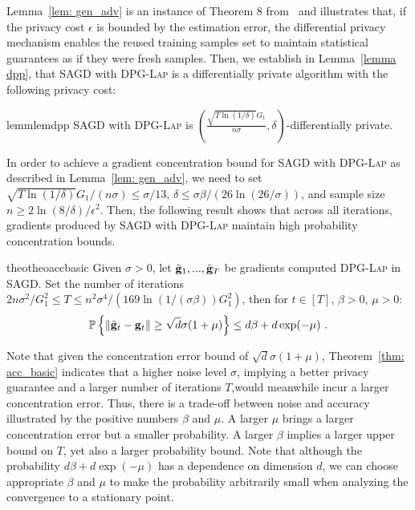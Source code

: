 \documentclass[11pt]{article}
\begin{document}
Lemma~\ref{lem: gen_adv} is an instance of Theorem 8 from~\cite{dwfe15} and illustrates that, if the privacy cost $\epsilon$ is bounded by the estimation error, the differential privacy mechanism enables the reused training samples set to maintain statistical guarantees as if they were fresh samples. 
Then, we establish in Lemma~\ref{lemma dpp}, that \textsc{SAGD} with \textsc{DPG-Lap} is a differentially private algorithm with the following privacy cost:
\begin{restatable}{lemm}{lemdpp}
\label{lemma dpp}
\textsc{SAGD} with \textsc{DPG-Lap} is $(\frac{\sqrt{T \ln(1/\delta)} G_1}{n\sigma}, \delta)$-differentially private. 
\end{restatable}  
In order to achieve a gradient concentration bound for \textsc{SAGD} with \textsc{DPG-Lap} as described in Lemma~\ref{lem: gen_adv}, we need to set $\sqrt{T \ln(1/\delta)} G_1/(n\sigma)\leq \sigma/13$, $\delta \leq \sigma \beta/(26 \ln(26/\sigma))$, and  sample size $n \geq 2\ln(8/\delta)/\epsilon^2$. 
Then, the following result shows that across all iterations, gradients produced by \textsc{SAGD} with \textsc{DPG-Lap} maintain high probability concentration bounds.

\begin{restatable}{theo}{theoaccbasic}
\label{thm: acc_basic}
Given $\sigma > 0$, let $\tilde {\mathbf{g}}_1,...,  \tilde {\mathbf{g}}_T$ be gradients computed \textsc{DPG-Lap} in \textsc{SAGD}. Set the number of iterations $ 2n\sigma^2/G_1^2\leq T \leq n^2 \sigma^4/(169 \ln(1/(\sigma \beta))G_1^2)$, then for $t \in [T]$, $\beta >0$, $\mu > 0$:
    \begin{equation*}
    \mathbb{P}\left\{\|\tilde {\mathbf{g}}_t - \mathbf{g}_t\| \geq \sqrt{d}\sigma(1+\mu)\right\} \leq d\beta + d\exp(-\mu)~.
    \end{equation*}
\end{restatable}
Note that given the concentration error bound of $\sqrt{d}\sigma(1+\mu)$, Theorem~\ref{thm: acc_basic} indicates that a higher noise level $\sigma$, implying a better privacy guarantee and a larger number of iterations $T$,would meanwhile incur a larger concentration error.
Thus, there is a trade-off between noise and accuracy illustrated by the positive numbers $\beta$ and $\mu$.
A larger $\mu$ brings a larger concentration error but a smaller probability. 
A larger $\beta$ implies a larger upper bound on $T$, yet also a larger probability bound. 
Note that although the probability $d\beta + d\exp(-\mu)$ has a dependence on dimension $d$, we can choose appropriate $\beta$ and $\mu$ to make the probability arbitrarily small when analyzing the convergence to a stationary point.
\end{document}
